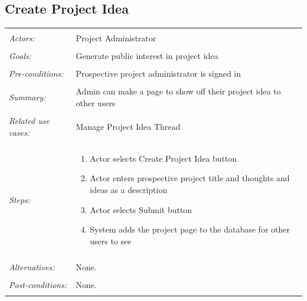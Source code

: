 \documentclass[11pt]{report}
\begin{document}
\subsection{Create Project Idea}
\begin{tabular}{ p{2cm} p{12cm} }
 \hline
 \\
 \textit{Actors:} & Project Administrator \\ 
 \\
 \textit{Goals:} & Generate public interest in project idea  \\
 \\
 \textit{Pre-conditions:} & Prospective project administrator is signed in  \\
 \\
 \textit{Summary:} &  Admin can make a page to show off their project idea to other users \\ 
 \\
 \textit{Related use cases:} & Manage Project Idea Thread \\ 
 \\
 \textit{Steps:} & \begin{enumerate}
  \item Actor selects Create Project Idea button
  \item Actor enters prospective project title and thoughts and ideas as a description
  \item Actor selects Submit button
  \item System adds the project page to the database for other users to see

 \end{enumerate} \\
 \\
 \textit{Alternatives:} & None. \\
 \\
 \textit{Post-conditions:} & None. \\
 \\
\hline
\end{tabular}
\end{document}

